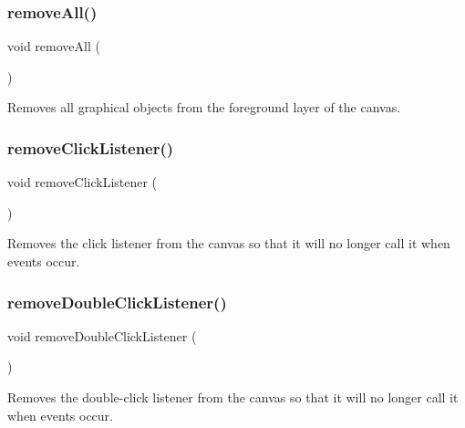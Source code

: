 \subsubsection{\texorpdfstring{remove\+All()}{removeAll()}}
{\footnotesize\ttfamily void remove\+All (\begin{DoxyParamCaption}{ }\end{DoxyParamCaption})\hspace{0.3cm}{\ttfamily [virtual]}}



Removes all graphical objects from the foreground layer of the canvas. 

\mbox{\label{classGCanvas_ad39d0325cde6b97ebda4b9d7787c633b}} 
\subsubsection{\texorpdfstring{remove\+Click\+Listener()}{removeClickListener()}}
{\footnotesize\ttfamily void remove\+Click\+Listener (\begin{DoxyParamCaption}{ }\end{DoxyParamCaption})\hspace{0.3cm}{\ttfamily [virtual]}}



Removes the click listener from the canvas so that it will no longer call it when events occur. 

\mbox{\label{classGCanvas_aa4250907e4cdd77349c04f0cf5cdd3d3}} 
\subsubsection{\texorpdfstring{remove\+Double\+Click\+Listener()}{removeDoubleClickListener()}}
{\footnotesize\ttfamily void remove\+Double\+Click\+Listener (\begin{DoxyParamCaption}{ }\end{DoxyParamCaption})\hspace{0.3cm}{\ttfamily [virtual]}}



Removes the double-\/click listener from the canvas so that it will no longer call it when events occur. 

